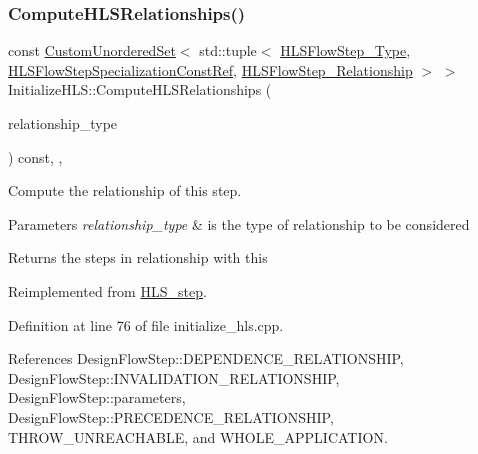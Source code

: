 \subsubsection{\texorpdfstring{Compute\+H\+L\+S\+Relationships()}{ComputeHLSRelationships()}}
{\footnotesize\ttfamily const \hyperlink{classCustomUnorderedSet}{Custom\+Unordered\+Set}$<$ std\+::tuple$<$ \hyperlink{hls__step_8hpp_ada16bc22905016180e26fc7e39537f8d}{H\+L\+S\+Flow\+Step\+\_\+\+Type}, \hyperlink{hls__step_8hpp_a5fdd2edf290c196531d21d68e13f0e74}{H\+L\+S\+Flow\+Step\+Specialization\+Const\+Ref}, \hyperlink{hls__step_8hpp_a3ad360b9b11e6bf0683d5562a0ceb169}{H\+L\+S\+Flow\+Step\+\_\+\+Relationship} $>$ $>$ Initialize\+H\+L\+S\+::\+Compute\+H\+L\+S\+Relationships (\begin{DoxyParamCaption}\item[{const \hyperlink{classDesignFlowStep_a723a3baf19ff2ceb77bc13e099d0b1b7}{Design\+Flow\+Step\+::\+Relationship\+Type}}]{relationship\+\_\+type }\end{DoxyParamCaption}) const\hspace{0.3cm}{\ttfamily [override]}, {\ttfamily [protected]}, {\ttfamily [virtual]}}



Compute the relationship of this step. 


\begin{DoxyParams}{Parameters}
{\em relationship\+\_\+type} & is the type of relationship to be considered \\
\hline
\end{DoxyParams}
\begin{DoxyReturn}{Returns}
the steps in relationship with this 
\end{DoxyReturn}


Reimplemented from \hyperlink{classHLS__step_aed0ce8cca9a1ef18e705fc1032ad4de5}{H\+L\+S\+\_\+step}.



Definition at line 76 of file initialize\+\_\+hls.\+cpp.



References Design\+Flow\+Step\+::\+D\+E\+P\+E\+N\+D\+E\+N\+C\+E\+\_\+\+R\+E\+L\+A\+T\+I\+O\+N\+S\+H\+IP, Design\+Flow\+Step\+::\+I\+N\+V\+A\+L\+I\+D\+A\+T\+I\+O\+N\+\_\+\+R\+E\+L\+A\+T\+I\+O\+N\+S\+H\+IP, Design\+Flow\+Step\+::parameters, Design\+Flow\+Step\+::\+P\+R\+E\+C\+E\+D\+E\+N\+C\+E\+\_\+\+R\+E\+L\+A\+T\+I\+O\+N\+S\+H\+IP, T\+H\+R\+O\+W\+\_\+\+U\+N\+R\+E\+A\+C\+H\+A\+B\+LE, and W\+H\+O\+L\+E\+\_\+\+A\+P\+P\+L\+I\+C\+A\+T\+I\+ON.

